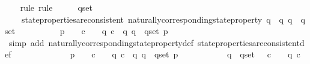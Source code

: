 \begin{isabellebody}
%
\isadelimproof
\ \ %
\endisadelimproof
%
\isatagproof
{}\isamarkupfalse%
\ {\isacharparenleft}rule{\isacharcomma}\ rule{\isacharparenright}\isanewline
{}\isamarkupfalse%
\ {\isacharminus}\isanewline
\ \ \isamarkupfalse%
\ q{\isacharunderscore}set\isanewline
\ \ \isamarkupfalse%
\ \isanewline
\ \ \ \ {\isachardoublequoteopen}state{\isacharunderscore}properties{\isacharunderscore}are{\isacharunderscore}consistent\ {\isacharbraceleft}naturally{\isacharunderscore}corresponding{\isacharunderscore}state{\isacharunderscore}property\ q\ {\isacharbar}\ q{\isachardot}\ q\ {\isasymin}\ q{\isacharunderscore}set{\isacharbraceright}\isanewline
\ \ \ \ {\isasymlongrightarrow}\ {\isacharparenleft}{\isasymexists}\ {\isasymsigma}\ {\isasymin}\ {\isasymSigma}{\isachardot}\ {\isasymforall}\ p\ {\isasymin}\ {\isacharbraceleft}{\isasymlambda}{\isasymsigma}{\isacharprime}{\isachardot}\ {\isasymforall}\ c\ {\isasymin}\ {\isasymepsilon}\ {\isasymsigma}{\isacharprime}{\isachardot}\ q\ c\ {\isacharbar}\ q{\isachardot}\ q\ {\isasymin}\ q{\isacharunderscore}set{\isacharbraceright}{\isachardot}\ p\ {\isasymsigma}{\isacharparenright}{\isachardoublequoteclose}\isanewline
\ \ \ \ \isamarkupfalse%
\ {\isacharparenleft}simp\ add{\isacharcolon}\ naturally{\isacharunderscore}corresponding{\isacharunderscore}state{\isacharunderscore}property{\isacharunderscore}def\ state{\isacharunderscore}properties{\isacharunderscore}are{\isacharunderscore}consistent{\isacharunderscore}def{\isacharparenright}\isanewline
\ \ \isamarkupfalse%
\ \isamarkupfalse%
\isanewline
\ \ \ \ {\isachardoublequoteopen}{\isacharparenleft}{\isasymexists}\ {\isasymsigma}\ {\isasymin}\ {\isasymSigma}{\isachardot}\ {\isasymforall}\ p\ {\isasymin}\ {\isacharbraceleft}{\isasymlambda}{\isasymsigma}{\isacharprime}{\isachardot}\ {\isasymforall}\ c\ {\isasymin}\ {\isasymepsilon}\ {\isasymsigma}{\isacharprime}{\isachardot}\ q\ c\ {\isacharbar}\ q{\isachardot}\ q\ {\isasymin}\ q{\isacharunderscore}set{\isacharbraceright}{\isachardot}\ p\ {\isasymsigma}{\isacharparenright}\isanewline
\ \ \ \ {\isasymlongrightarrow}\ {\isacharparenleft}{\isasymexists}\ {\isasymsigma}\ {\isasymin}\ {\isasymSigma}{\isachardot}\ {\isasymforall}\ q{\isacharprime}\ {\isasymin}\ q{\isacharunderscore}set{\isachardot}\ {\isacharparenleft}{\isasymlambda}{\isasymsigma}{\isacharprime}{\isachardot}\ {\isasymforall}\ c\ {\isasymin}\ {\isasymepsilon}\ {\isasymsigma}{\isacharprime}{\isachardot}\ q{\isacharprime}\ c{\isacharparenright}\ {\isasymsigma}{\isacharparenright}{\isachardoublequoteclose}\isanewline

\end{isabellebody}
